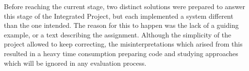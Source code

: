 \documentclass{acmtog}
\begin{document}
Before reaching the current stage, two distinct solutions were prepared to answer this stage of the Integrated Project, but each implemented a system different than the one intended. The reason for this to happen was the lack of a guiding example, or a text describing the assignment. Although the simplicity of the project allowed to keep correcting, the misinterpretations which arised from this resulted in a heavy time consumption preparing code and studying approaches which will be ignored in any evaluation process.
\end{document}
